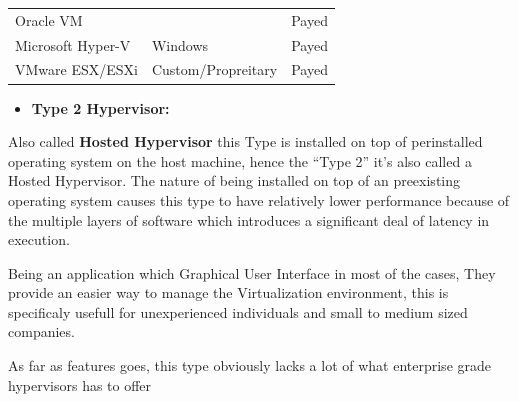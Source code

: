 \documentclass[
  14pt,
  english,
  a4paper,
]{scrreprt}
\providecommand{\tightlist}{%
  \setlength{\itemsep}{0pt}\setlength{\parskip}{0pt}}
\begin{document}
\begin{longtable}[]{@{}lll@{}}
\begin{minipage}[t]{0.25\columnwidth}
Oracle VM\strut
\end{minipage} & \begin{minipage}[t]{0.30\columnwidth}\raggedright
\strut
\end{minipage} & \begin{minipage}[t]{0.22\columnwidth}\raggedright
Payed\strut
\end{minipage}\tabularnewline
\begin{minipage}[t]{0.25\columnwidth}\raggedright
Microsoft Hyper-V\strut
\end{minipage} & \begin{minipage}[t]{0.30\columnwidth}\raggedright
Windows\strut
\end{minipage} & \begin{minipage}[t]{0.22\columnwidth}\raggedright
Payed\strut
\end{minipage}\tabularnewline
\begin{minipage}[t]{0.25\columnwidth}\raggedright
VMware ESX/ESXi\strut
\end{minipage} & \begin{minipage}[t]{0.30\columnwidth}\raggedright
Custom/Propreitary\strut
\end{minipage} & \begin{minipage}[t]{0.22\columnwidth}\raggedright
Payed\strut
\end{minipage}\tabularnewline
\bottomrule
\end{longtable}

\begin{itemize}
\tightlist
\item
  \textbf{Type 2 Hypervisor:}
\end{itemize}

Also called \textbf{Hosted Hypervisor} this Type is installed on top of
perinstalled operating system on the host machine, hence the ``Type 2''
it's also called a Hosted Hypervisor. The nature of being installed on
top of an preexisting operating system causes this type to have
relatively lower performance because of the multiple layers of software
which introduces a significant deal of latency in execution.

Being an application which Graphical User Interface in most of the
cases, They provide an easier way to manage the Virtualization
environment, this is specificaly usefull for unexperienced individuals
and small to medium sized companies.

As far as features goes, this type obviously lacks a lot of what
enterprise grade hypervisors has to offer
\end{document}
